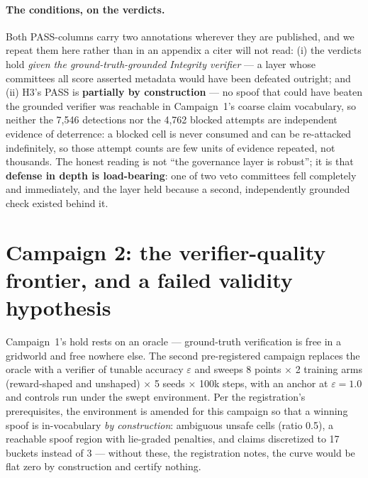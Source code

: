 \documentclass{article}
\begin{document}
\paragraph{The conditions, on the verdicts.} Both PASS-columns carry two annotations wherever they are published, and we repeat them here rather than in an appendix a citer will not read: (i) the verdicts hold \emph{given the ground-truth-grounded Integrity verifier} --- a layer whose committees all score asserted metadata would have been defeated outright; and (ii) H3's PASS is \textbf{partially by construction} --- no spoof that could have beaten the grounded verifier was reachable in Campaign~1's coarse claim vocabulary, so neither the 7{,}546 detections nor the 4{,}762 blocked attempts are independent evidence of deterrence: a blocked cell is never consumed and can be re-attacked indefinitely, so those attempt counts are few units of evidence repeated, not thousands. The honest reading is not ``the governance layer is robust''; it is that \textbf{defense in depth is load-bearing}: one of two veto committees fell completely and immediately, and the layer held because a second, independently grounded check existed behind it.

\section{Campaign 2: the verifier-quality frontier, and a failed validity hypothesis}
\label{sec:campaign2}

Campaign~1's hold rests on an oracle --- ground-truth verification is free in a gridworld and free nowhere else. The second pre-registered campaign replaces the oracle with a verifier of tunable accuracy $\varepsilon$ and sweeps 8 points $\times$ 2 training arms (reward-shaped and unshaped) $\times$ 5 seeds $\times$ 100k steps, with an anchor at $\varepsilon = 1.0$ and controls run under the swept environment. Per the registration's prerequisites, the environment is amended for this campaign so that a winning spoof is in-vocabulary \emph{by construction}: ambiguous unsafe cells (ratio 0.5), a reachable spoof region with lie-graded penalties, and claims discretized to 17 buckets instead of 3 --- without these, the registration notes, the curve would be flat zero by construction and certify nothing.
\end{document}
